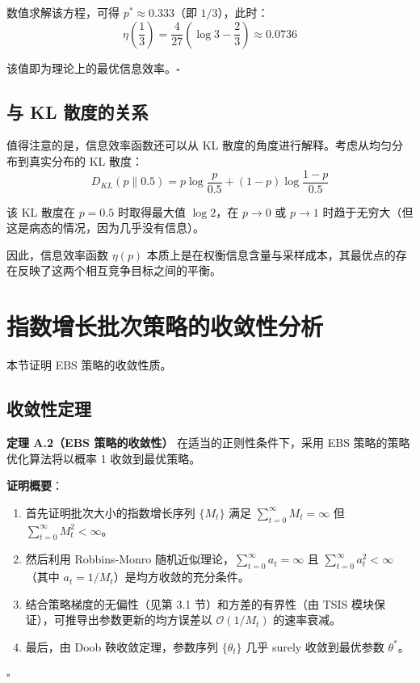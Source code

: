 数值求解该方程，可得 $p^* \approx 0.333$（即 $1/3$），此时：
$$\eta\left(\frac{1}{3}\right) = \frac{4}{27} \left( \log 3 - \frac{2}{3} \right) \approx 0.0736$$

该值即为理论上的最优信息效率。$\square$

\subsection{与 KL 散度的关系}

值得注意的是，信息效率函数还可以从 KL 散度的角度进行解释。考虑从均匀分布到真实分布的 KL 散度：
$$D_{KL}(p \| 0.5) = p \log \frac{p}{0.5} + (1-p) \log \frac{1-p}{0.5}$$

该 KL 散度在 $p=0.5$ 时取得最大值 $\log 2$，在 $p \to 0$ 或 $p \to 1$ 时趋于无穷大（但这是病态的情况，因为几乎没有信息）。

因此，信息效率函数 $\eta(p)$ 本质上是在权衡信息含量与采样成本，其最优点的存在反映了这两个相互竞争目标之间的平衡。

\section{指数增长批次策略的收敛性分析}
\label{sec:ebs_convergence}

本节证明 EBS 策略的收敛性质。

\subsection{收敛性定理}

\textbf{定理 A.2（EBS 策略的收敛性）} 在适当的正则性条件下，采用 EBS 策略的策略优化算法将以概率 1 收敛到最优策略。

\textbf{证明概要}：
\begin{enumerate}
    \item 首先证明批次大小的指数增长序列 $\{M_t\}$ 满足 $\sum_{t=0}^{\infty} M_t = \infty$ 但 $\sum_{t=0}^{\infty} M_t^2 < \infty$。
    \item 然后利用 Robbins-Monro 随机近似理论，$\sum_{t=0}^{\infty} a_t = \infty$ 且 $\sum_{t=0}^{\infty} a_t^2 < \infty$（其中 $a_t = 1/M_t$）是均方收敛的充分条件。
    \item 结合策略梯度的无偏性（见第 3.1 节）和方差的有界性（由 TSIS 模块保证），可推导出参数更新的均方误差以 $\mathcal{O}(1/M_t)$ 的速率衰减。
    \item 最后，由 Doob 鞅收敛定理，参数序列 $\{\theta_t\}$ 几乎 surely 收敛到最优参数 $\theta^*$。
\end{enumerate}
$\square$

